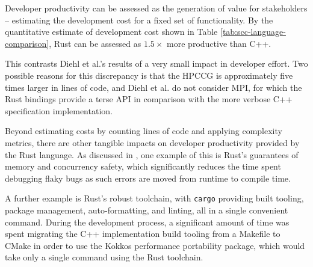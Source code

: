 Developer productivity can be assessed as the generation of value for stakeholders -- estimating the development cost for a fixed set of functionality. By the quantitative estimate of development cost shown in Table \ref{tab:scc-language-comparison}, Rust can be assessed as $1.5 \times$ more productive than C++.

This contrasts Diehl et al.'s results of a very small impact in developer effort. Two possible reasons for this discrepancy is that the HPCCG is approximately five times larger in lines of code, and Diehl et al. do not consider MPI, for which the Rust bindings provide a terse API in comparison with the more verbose C++ specification implementation.

Beyond estimating costs by counting lines of code and applying complexity metrics, there are other tangible impacts on developer productivity provided by the Rust language. As discussed in , one example of this is Rust's guarantees of memory and concurrency safety, which significantly reduces the time spent debugging flaky bugs as such errors are moved from runtime to compile time.

A further example is Rust's robust toolchain, with \texttt{cargo} providing built tooling, package management, auto-formatting, and linting, all in a single convenient command. During the development process, a significant amount of time was spent migrating the C++ implementation build tooling from a Makefile to CMake in order to use the Kokkos performance portability package, which would take only a single command using the Rust toolchain.
